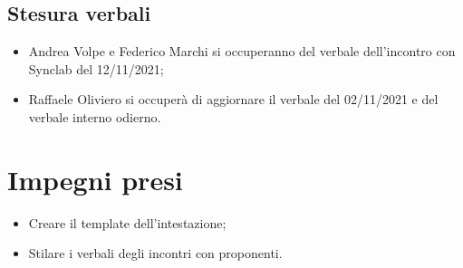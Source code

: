 \documentclass[a4paper, 12pt]{article}
\begin{document}
\subsection{Stesura verbali}
\begin{itemize}
    \item Andrea Volpe e Federico Marchi si occuperanno del verbale dell'incontro con Synclab del 12/11/2021;
    \item Raffaele Oliviero si occuperà di aggiornare il verbale del 02/11/2021 e del verbale interno odierno.
\end{itemize}

\section{Impegni presi}
\begin{itemize}
\item Creare il template dell'intestazione;
\item Stilare i verbali degli incontri con proponenti.
\end{itemize}
\end{document}
